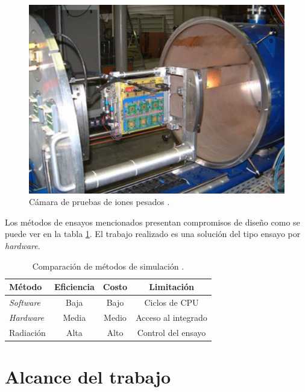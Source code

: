 \begin{figure}[htbp]
	\centering
	\includegraphics[width=\textwidth]{./Figures/heavy_ion_latchup_tests_in_louvain_la_neuve.jpg}
    \caption{Cámara de pruebas de iones pesados \citep{WEBSITE:heavy_ion}.}
	\label{fig:iones}
\end{figure}

Los métodos de ensayos mencionados presentan compromisos de diseño como se puede ver en la tabla \ref{tab:arte}.
El trabajo realizado es una solución del tipo ensayo por \emph{hardware}.

\begin{table}[h]
	\centering
	\caption[Comparación de métodos de simulación]{Comparación de métodos de simulación \citep{ARTICLE:velazco}.}
	\begin{tabular}{l c c c}    
		\toprule
        \textbf{Método}        & \textbf{Eficiencia} & \textbf{Costo} & \textbf{Limitación}\\
		\midrule
        \emph{Software}        & Baja                & Bajo           & Ciclos de CPU\\		
        \emph{Hardware}        & Media               & Medio          & Acceso al integrado\\
        Radiación              & Alta                & Alto           & Control del ensayo\\
		\bottomrule
		\hline
	\end{tabular}
	\label{tab:arte}
\end{table}

\newpage
\section{Alcance del trabajo}
\label{sec:alcance}

